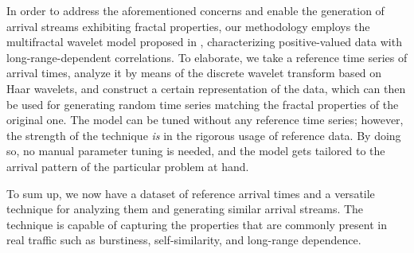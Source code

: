 In order to address the aforementioned concerns and enable the generation of
arrival streams exhibiting fractal properties, our methodology employs the
multifractal wavelet model proposed in \cite{riedi1999}, characterizing
positive-valued data with long-range-dependent correlations. To elaborate, we
take a reference time series of arrival times, analyze it by means of the
discrete wavelet transform based on Haar wavelets, and construct a certain
representation of the data, which can then be used for generating random time
series matching the fractal properties of the original one. The model can be
tuned without any reference time series; however, the strength of the technique
\emph{is} in the rigorous usage of reference data. By doing so, no manual
parameter tuning is needed, and the model gets tailored to the arrival pattern
of the particular problem at hand.

To sum up, we now have a dataset of reference arrival times and a versatile
technique for analyzing them and generating similar arrival streams. The
technique is capable of capturing the properties that are commonly present in
real traffic such as burstiness, self-similarity, and long-range dependence.
